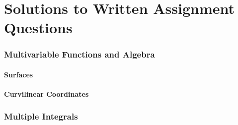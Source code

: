 \documentclass{article}
\begin{document}
\newpage
\part{Solutions to Written Assignment Questions}
\setcounter{section}{1}

\section{Multivariable Functions and Algebra}

\newpage %

\newpage %
\subsection{Surfaces}
\newpage %
\subsection{Curvilinear Coordinates}
\newpage %

\newpage %

\newpage %


\section{Multiple Integrals}

\end{document}
